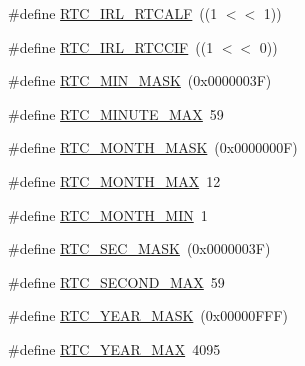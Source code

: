 \begin{DoxyCompactItemize}
\item 
\#define \hyperlink{group__RTC__17XX__40XX_ga237351d2c7f08b447254eff9578eb11e}{R\+T\+C\+\_\+\+I\+R\+L\+\_\+\+R\+T\+C\+A\+LF}~((1 $<$$<$ 1))
\item 
\#define \hyperlink{group__RTC__17XX__40XX_gaf706fff68e830a082d476467fe71f297}{R\+T\+C\+\_\+\+I\+R\+L\+\_\+\+R\+T\+C\+C\+IF}~((1 $<$$<$ 0))
\item 
\#define \hyperlink{group__RTC__17XX__40XX_ga9f3224adad8ed73109ee0309c3580998}{R\+T\+C\+\_\+\+M\+I\+N\+\_\+\+M\+A\+SK}~(0x0000003\+F)
\item 
\#define \hyperlink{group__RTC__17XX__40XX_gab55b557eeb5c66e94a2fda3638e3b7ee}{R\+T\+C\+\_\+\+M\+I\+N\+U\+T\+E\+\_\+\+M\+AX}~59
\item 
\#define \hyperlink{group__RTC__17XX__40XX_ga491df15fba29dd3237f7bd59a9338050}{R\+T\+C\+\_\+\+M\+O\+N\+T\+H\+\_\+\+M\+A\+SK}~(0x0000000\+F)
\item 
\#define \hyperlink{group__RTC__17XX__40XX_gacad40d1a94fd9b6884ec6160abb07674}{R\+T\+C\+\_\+\+M\+O\+N\+T\+H\+\_\+\+M\+AX}~12
\item 
\#define \hyperlink{group__RTC__17XX__40XX_ga5002ab062a5871b7ed73c7ff0cb00e6b}{R\+T\+C\+\_\+\+M\+O\+N\+T\+H\+\_\+\+M\+IN}~1
\item 
\#define \hyperlink{group__RTC__17XX__40XX_gabc478af38e7fa3018d8449f22c51d10e}{R\+T\+C\+\_\+\+S\+E\+C\+\_\+\+M\+A\+SK}~(0x0000003\+F)
\item 
\#define \hyperlink{group__RTC__17XX__40XX_ga60bbeee3abbb647a0daa7c2130965646}{R\+T\+C\+\_\+\+S\+E\+C\+O\+N\+D\+\_\+\+M\+AX}~59
\item 
\#define \hyperlink{group__RTC__17XX__40XX_ga35a455a48ccdb557b824e87701449c76}{R\+T\+C\+\_\+\+Y\+E\+A\+R\+\_\+\+M\+A\+SK}~(0x00000\+F\+F\+F)
\item 
\#define \hyperlink{group__RTC__17XX__40XX_ga72b68660aec4a924c12a124e2ec5f852}{R\+T\+C\+\_\+\+Y\+E\+A\+R\+\_\+\+M\+AX}~4095
\end{DoxyCompactItemize}
